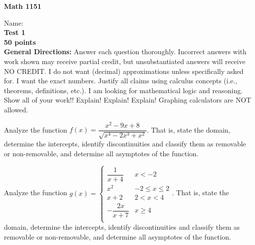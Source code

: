 \documentclass[addpoints,12pt]{exam}
\begin{document}
	\noindent\begin{large}\textbf{Math 1151}\end{large}
	\hspace{2in} Name:\hrulefill\\
	\textbf{Test 1}\\
	\textbf{50 points} \\
  
	\noindent\textbf{General Directions:}  Answer each question thoroughly.  Incorrect answers with work shown may receive partial credit, but unsubstantiated answers will receive NO CREDIT.  I do not want (decimal) approximations unless specifically asked for.  I want the exact numbers.  Justify all claims using calculus concepts (i.e., theorems, definitions, etc.).  I am looking for mathematical logic and reasoning.  Show all of your work!! Explain!  Explain!  Explain!  Graphing calculators are NOT allowed.
	
	\begin{questions}
		\question[25] Analyze the function $f(x)=\dfrac{x^2-9x+8}{\sqrt{x^4-2x^3+x^2}}$.  That is, state the domain, determine the intercepts, identify discontinuities and classify them as removable or non-removable, and determine all asymptotes of the function.
		
		\clearpage
		
		\question[25] Analyze the function $g(x) = \begin{cases}\dfrac{1}{x+4} & x<-2 \\ 
				x^2 & -2 \leq x \leq 2 \\
				x+2 & 2<x<4 \\
				-\dfrac{2x}{x+7} & x \geq 4 \\
				 \end{cases}$.  That is, state the domain, determine the intercepts, identify discontinuities and classify them as removable or non-removable, and determine all asymptotes of the function.
	\end{questions}
\end{document}
